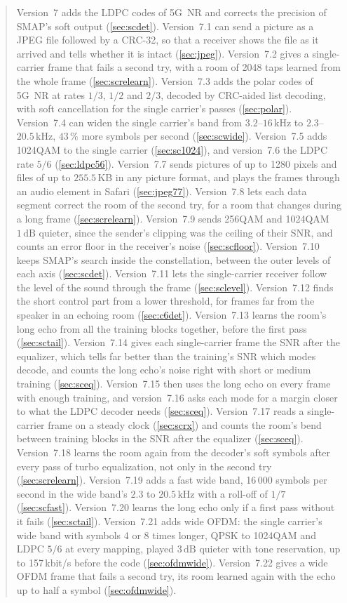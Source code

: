 \documentclass[11pt,a4paper]{article}
\newcommand{\kHz}{\,\mathrm{kHz}}
\newcommand{\dB}{\,\mathrm{dB}}
\theoremstyle{remark}
\begin{document}
\begin{abstract}
Version~7 adds the LDPC codes of 5G~NR and corrects the precision of SMAP's soft output (\cref{sec:scdet}). Version~7.1 can send a picture as a JPEG file followed by a CRC-32, so that a receiver shows the file as it arrived and tells whether it is intact (\cref{sec:jpeg}). Version~7.2 gives a single-carrier frame that fails a second try, with a room of 2048 taps learned from the whole frame (\cref{sec:screlearn}). Version~7.3 adds the polar codes of 5G~NR at rates $1/3$, $1/2$ and $2/3$, decoded by CRC-aided list decoding, with soft cancellation for the single carrier's passes (\cref{sec:polar}). Version~7.4 can widen the single carrier's band from $3.2$--$16\kHz$ to $2.3$--$20.5\kHz$, $43\,\%$ more symbols per second (\cref{sec:scwide}). Version~7.5 adds 1024QAM to the single carrier (\cref{sec:sc1024}), and version~7.6 the LDPC rate $5/6$ (\cref{sec:ldpc56}). Version~7.7 sends pictures of up to 1280 pixels and files of up to $255.5$\,KB in any picture format, and plays the frames through an audio element in Safari (\cref{sec:jpeg77}). Version~7.8 lets each data segment correct the room of the second try, for a room that changes during a long frame (\cref{sec:screlearn}). Version~7.9 sends 256QAM and 1024QAM $1\dB$ quieter, since the sender's clipping was the ceiling of their SNR, and counts an error floor in the receiver's noise (\cref{sec:scfloor}). Version~7.10 keeps SMAP's search inside the constellation, between the outer levels of each axis (\cref{sec:scdet}). Version~7.11 lets the single-carrier receiver follow the level of the sound through the frame (\cref{sec:sclevel}). Version~7.12 finds the short control part from a lower threshold, for frames far from the speaker in an echoing room (\cref{sec:c6det}). Version~7.13 learns the room's long echo from all the training blocks together, before the first pass (\cref{sec:sctail}). Version~7.14 gives each single-carrier frame the SNR after the equalizer, which tells far better than the training's SNR which modes decode, and counts the long echo's noise right with short or medium training (\cref{sec:sceq}). Version~7.15 then uses the long echo on every frame with enough training, and version~7.16 asks each mode for a margin closer to what the LDPC decoder needs (\cref{sec:sceq}). Version~7.17 reads a single-carrier frame on a steady clock (\cref{sec:scrx}) and counts the room's bend between training blocks in the SNR after the equalizer (\cref{sec:sceq}). Version~7.18 learns the room again from the decoder's soft symbols after every pass of turbo equalization, not only in the second try (\cref{sec:screlearn}). Version~7.19 adds a fast wide band, 16\,000 symbols per second in the wide band's $2.3$ to $20.5\kHz$ with a roll-off of $1/7$ (\cref{sec:scfast}). Version~7.20 learns the long echo only if a first pass without it fails (\cref{sec:sctail}). Version~7.21 adds wide OFDM: the single carrier's wide band with symbols 4 or 8 times longer, QPSK to 1024QAM and LDPC $5/6$ at every mapping, played $3\dB$ quieter with tone reservation, up to 157\,kbit/s before the code (\cref{sec:ofdmwide}). Version~7.22 gives a wide OFDM frame that fails a second try, its room learned again with the echo up to half a symbol (\cref{sec:ofdmwide}).
\end{abstract}
\end{document}
